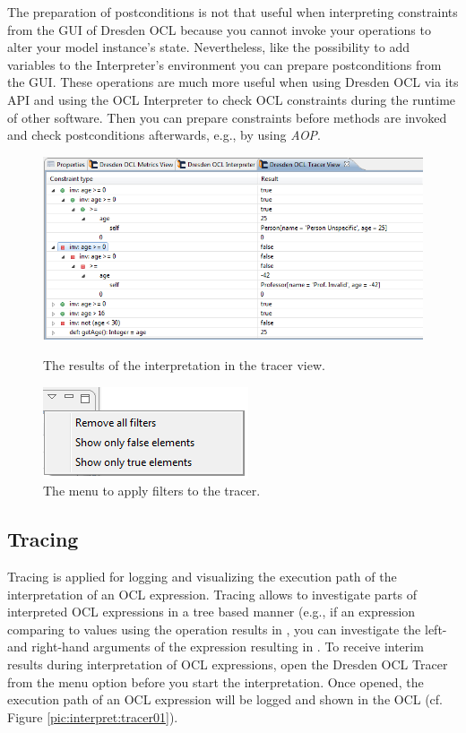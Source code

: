 The preparation of postconditions is not that useful when interpreting 
constraints from the GUI of Dresden OCL because you cannot invoke your 
operations to alter your model instance's state. Nevertheless, like the 
possibility to add variables to the Interpreter's environment you can prepare 
postconditions from the GUI. These operations are much more useful when using 
Dresden OCL via its API and using the \acs{OCL} Interpreter to check \acs{OCL} 
constraints during the runtime of other software. Then you can prepare
constraints before methods are invoked and check postconditions afterwards, 
e.g., by using \emph{\acf{AOP}}.

\begin{figure}[h]
	\centering
	\includegraphics[width=1.0\linewidth]{figures/interpreter/tracer01.png}
	\caption{The results of the interpretation in the tracer view.}
	\label{pic:interpret:tracer01}

	\vspace{3.0em}	
	
	\centering
	\includegraphics[scale=1]{figures/interpreter/tracer02.png}
	\caption{The menu to apply filters to the tracer.}
	\label{pic:interpret:tracer02}
\end{figure}

\subsection{Tracing}

Tracing is applied for logging and visualizing the execution path of the
interpretation of an \acs{OCL} expression. Tracing allows to investigate
parts of interpreted \acs{OCL} expressions in a tree based manner (e.g., if
an expression comparing to values using the \code{=} operation results in
, you can investigate the left- and right-hand arguments of the
\code{=} expression resulting in . To receive interim results
during interpretation of \acs{OCL} expressions, open the Dresden \acs{OCL}
Tracer from the menu option 
before you start the interpretation. Once opened, the execution path of an
\acs{OCL} expression will be logged and shown in the \acs{OCL}  (cf. Figure \ref{pic:interpret:tracer01}).

